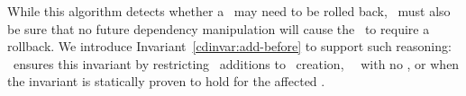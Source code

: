 While this algorithm detects whether a \chdesc\ may need to be rolled
back, \Kudos\ must also be sure that no future dependency manipulation
will cause the \chdesc\ to require a rollback.
%
We introduce Invariant~\ref{cdinvar:add-before} to support such reasoning:
%
%
\noindent \Kudos\ ensures this invariant by restricting \before\
additions to \chdesc\ creation, \noop\ \chdescs\ with no \afters, or
when the invariant is statically proven to hold for the affected
\chdescs.
